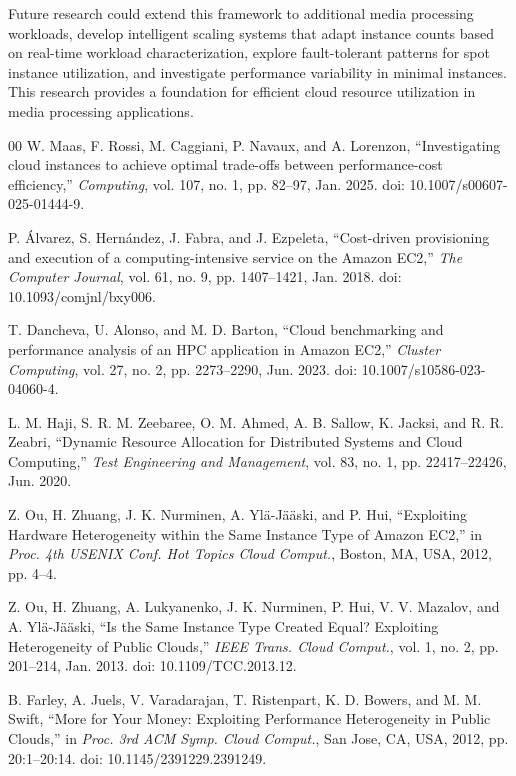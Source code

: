 \documentclass[conference]{IEEEtran}
\begin{document}
	Future research could extend this framework to additional media processing workloads, develop intelligent scaling systems that adapt instance counts based on real-time workload characterization, explore fault-tolerant patterns for spot instance utilization, and investigate performance variability in minimal instances. This research provides a foundation for efficient cloud resource utilization in media processing applications.
	
	\begin{thebibliography}{00}
		 W. Maas, F. Rossi, M. Caggiani, P. Navaux, and A. Lorenzon, ``Investigating cloud instances to achieve optimal trade-offs between performance-cost efficiency,'' \emph{Computing}, vol. 107, no. 1, pp. 82--97, Jan. 2025. doi: 10.1007/s00607-025-01444-9.
		
		 P. Álvarez, S. Hernández, J. Fabra, and J. Ezpeleta, ``Cost-driven provisioning and execution of a computing-intensive service on the Amazon EC2,'' \emph{The Computer Journal}, vol. 61, no. 9, pp. 1407--1421, Jan. 2018. doi: 10.1093/comjnl/bxy006.
		
		 T. Dancheva, U. Alonso, and M. D. Barton, ``Cloud benchmarking and performance analysis of an HPC application in Amazon EC2,'' \emph{Cluster Computing}, vol. 27, no. 2, pp. 2273--2290, Jun. 2023. doi: 10.1007/s10586-023-04060-4.
		
		 L. M. Haji, S. R. M. Zeebaree, O. M. Ahmed, A. B. Sallow, K. Jacksi, and R. R. Zeabri, ``Dynamic Resource Allocation for Distributed Systems and Cloud Computing,'' \emph{Test Engineering and Management}, vol. 83, no. 1, pp. 22417--22426, Jun. 2020.
		
		 Z. Ou, H. Zhuang, J. K. Nurminen, A. Ylä-Jääski, and P. Hui, ``Exploiting Hardware Heterogeneity within the Same Instance Type of Amazon EC2,'' in \emph{Proc. 4th USENIX Conf. Hot Topics Cloud Comput.}, Boston, MA, USA, 2012, pp. 4--4.
		
		 Z. Ou, H. Zhuang, A. Lukyanenko, J. K. Nurminen, P. Hui, V. V. Mazalov, and A. Ylä-Jääski, ``Is the Same Instance Type Created Equal? Exploiting Heterogeneity of Public Clouds,'' \emph{IEEE Trans. Cloud Comput.}, vol. 1, no. 2, pp. 201--214, Jan. 2013. doi: 10.1109/TCC.2013.12.
		
		 B. Farley, A. Juels, V. Varadarajan, T. Ristenpart, K. D. Bowers, and M. M. Swift, ``More for Your Money: Exploiting Performance Heterogeneity in Public Clouds,'' in \emph{Proc. 3rd ACM Symp. Cloud Comput.}, San Jose, CA, USA, 2012, pp. 20:1--20:14. doi: 10.1145/2391229.2391249.
		

\end{thebibliography}
\end{document}
